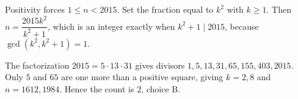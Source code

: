 Positivity forces $1\le n<2015$. Set the fraction equal to $k^2$ with $k\ge1$. Then $n=\dfrac{2015k^2}{k^2+1}$, which is an integer exactly when $k^2+1\mid2015$, because $\gcd(k^2,k^2+1)=1$.

The factorization $2015=5\cdot13\cdot31$ gives divisors $1,5,13,31,65,155,403,2015$. Only $5$ and $65$ are one more than a positive square, giving $k=2,8$ and $n=1612,1984$. Hence the count is $\boxed2$, choice $\boxed{\text{B}}$.
